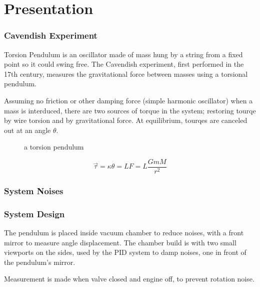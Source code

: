 \documentclass[\main/master.tex]{subfiles}
\begin{document}
\chapter{Presentation}\label{chp:example-1}




\subsection{Cavendish Experiment}
Torsion Pendulum is an oscillator made of mass hung by a string from a fixed point so it could swing free. The Cavendish experiment, first performed in the 17th century, measures the gravitational force between masses using a torsional pendulum.
\par 
Assuming no friction or other damping force (simple harmonic oscillator) when a mass is interduced, there are two sources of torque in the system; restoring tourqe by wire torsion and by gravitational force. At equilibrium, tourqes are canceled out at an angle $\theta$.

\begin{figure}[htbp]
	\centering
	\caption[pendulum]{a torsion pendulum}
	\label{fig:torsion_pendulum}
\end{figure}
\begin{equation}
\overrightarrow{\tau} = \kappa\theta = LF = L\frac{GmM}{r^2}    \label{eqn:gravitation_tourqe}
\end{equation}

\subsection{System Noises}
\subsection{System Design}
The pendulum is placed inside vacuum chamber to reduce noises, with a front mirror to measure angle displacement. The chamber build is  with two small viewports on the sides, used by the PID system to damp noises, one in front of the pendulum's mirror. 
\par
Measurement is made when valve closed and engine off, to prevent rotation noise.
\end{document}

